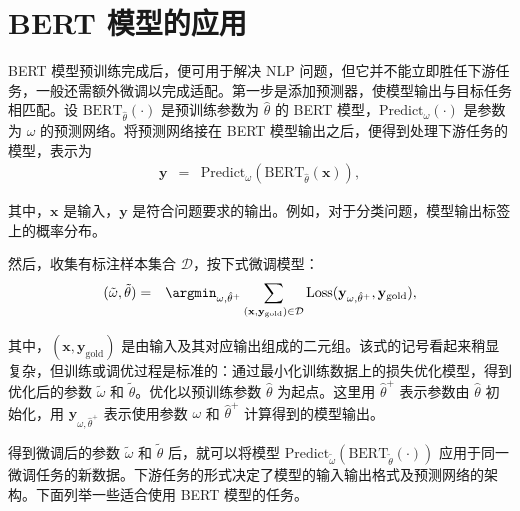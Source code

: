 
\section{BERT 模型的应用}
\label{sec:pre-training-application}

\noindent BERT 模型预训练完成后，便可用于解决 NLP 问题，但它并不能立即胜任下游任务，一般还需额外微调以完成适配。第一步是添加预测器，使模型输出与目标任务相匹配。设 $\mathrm{BERT}_{\hat{\theta}}(\cdot)$ 是预训练参数为 $\hat{\theta}$ 的 BERT 模型，$\mathrm{Predict}_{\omega}(\cdot)$ 是参数为 $\omega$ 的预测网络。将预测网络接在 BERT 模型输出之后，便得到处理下游任务的模型，表示为
\begin{eqnarray}
\mathbf{y} & = & \mathrm{Predict}_{\omega}(\mathrm{BERT}_{\hat{\theta}}(\mathbf{x})),
\end{eqnarray}

\noindent 其中，$\mathbf{x}$ 是输入，$\mathbf{y}$ 是符合问题要求的输出。例如，对于分类问题，模型输出标签上的概率分布。

然后，收集有标注样本集合 $\mathcal{D}$，按下式微调模型：
\begin{eqnarray}
(\tilde{\omega},\tilde{\theta}) & = & \argmin_{\omega,\hat{\theta}^{+}} \sum_{(\mathbf{x},\mathbf{y}_{\mathrm{gold}}) \in \mathcal{D}} \mathrm{Loss}(\mathbf{y}_{\omega,\hat{\theta}^{+}},\mathbf{y}_{\mathrm{gold}}),
\end{eqnarray}

\noindent 其中，$(\mathbf{x},\mathbf{y}_{\mathrm{gold}})$ 是由输入及其对应输出组成的二元组。该式的记号看起来稍显复杂，但训练或调优过程是标准的：通过最小化训练数据上的损失优化模型，得到优化后的参数 $\tilde{\omega}$ 和 $\tilde{\theta}$。优化以预训练参数 $\hat{\theta}$ 为起点。这里用 $\hat{\theta}^{+}$ 表示参数由 $\hat{\theta}$ 初始化，用 $\mathbf{y}_{\omega,\hat{\theta}^{+}}$ 表示使用参数 $\omega$ 和 $\hat{\theta}^{+}$ 计算得到的模型输出。

得到微调后的参数 $\tilde{\omega}$ 和 $\tilde{\theta}$ 后，就可以将模型 $\mathrm{Predict}_{\tilde{\omega}}(\mathrm{BERT}_{\tilde{\theta}}(\cdot))$ 应用于同一微调任务的新数据。下游任务的形式决定了模型的输入输出格式及预测网络的架构。下面列举一些适合使用 BERT 模型的任务。

